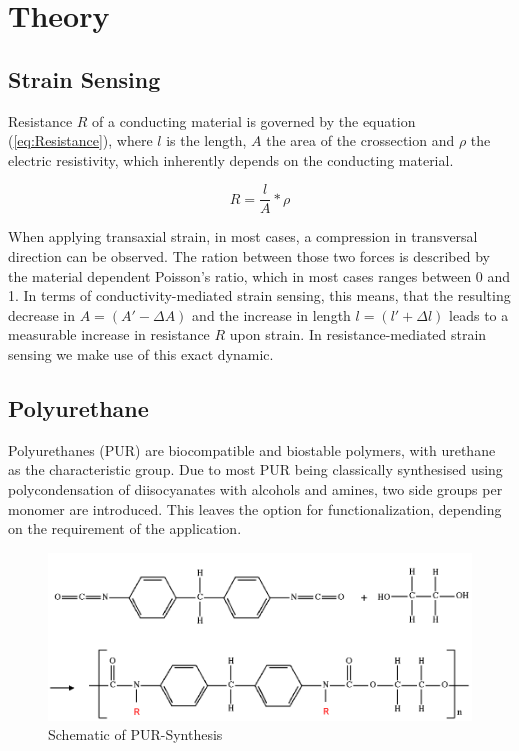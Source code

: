 \section{Theory}
\label{sec:Theory}

\subsection{Strain Sensing}
Resistance $R$ of a conducting material is governed by the equation (\ref{eq:Resistance}), where $l$ is the length, $A$ the area of the crossection and $\rho$ the electric resistivity, which inherently depends on the conducting material.

\begin{equation}
\label{eq:Resistance}
    R = \frac{l}{A}*\rho
\end{equation}

When applying transaxial strain, in most cases, a compression in transversal direction can be observed. The ration between those two forces is described by the material dependent Poisson's ratio, which in most cases ranges between 0 and 1. \cite{Gercek} In terms of conductivity-mediated strain sensing, this means, that the resulting decrease in $A = (A' -\Delta A)$ and the increase in length $l= (l' +\Delta l)$ leads to a measurable increase in resistance $R$ upon strain. In resistance-mediated strain sensing we make use of this exact dynamic.


\subsection{Polyurethane}

Polyurethanes (PUR) are biocompatible and biostable polymers, with urethane as 
the characteristic group. Due to most PUR being classically synthesised using 
polycondensation of diisocyanates with alcohols and amines, two side groups per 
monomer are introduced. This leaves the option for functionalization, depending on the requirement of the application. 

\begin{figure}[H]
    \centerline{\includegraphics[scale=0.7]{./pic/Polyurethane_mod.png}}
    \caption{Schematic of PUR-Synthesis}
    \label{fig:PURSynth}
\end{figure}

